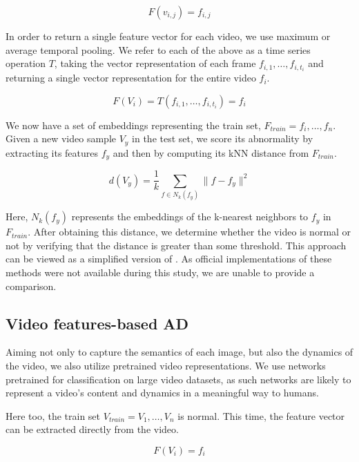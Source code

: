 \documentclass{article}
\begin{document}
\begin{equation}
    F(v_{i,j})=f_{i,j}
\end{equation}

In order to return a single feature vector for each video, we use maximum or average temporal pooling. We refer to each of the above as a time series operation $T$, taking the vector representation of each frame $f_{i,1}, \ldots, f_{i,t_i}$ and returning a single vector representation for the entire video $f_i$.

\begin{equation}
    F(V_i)=T(f_{i,1},\ldots,f_{i,t_i}) = f_i
\end{equation}

We now have a set of embeddings representing the train set, $F_{train}=f_i,\ldots,f_n$. Given a new video sample $V_y$ in the test set, we score its abnormality by extracting its features $f_y$ and then by computing its kNN distance from $F_{train}$.

\begin{equation}
    \label{eq:knn}
    d(V_y) = \frac{1}{k} \sum_{f \in N_k(f_y)}{\|f - f_y\|^2}
\end{equation}

Here, $N_k(f_y)$ represents the embeddings of the k-nearest neighbors to $f_y$ in $F_{train}$. After obtaining this distance, we determine whether the video is normal or not by verifying that the distance is greater than some threshold. 
This approach can be viewed as a simplified version of \cite{doshi2020continual,pourreza2021ano}. As official implementations of these methods were not available during this study, we are unable to provide a comparison.

\subsection{Video features-based AD}

Aiming not only to capture the semantics of each image, but also the dynamics of the video, we also utilize pretrained video representations. We use networks pretrained for classification on large video datasets, as such networks are likely to represent a video's content and dynamics in a meaningful way to humans.

Here too, the train set $V_{train}=V_1,\ldots,V_n$ is normal. This time, the feature vector can be extracted directly from the video. 

\begin{equation}
    F(V_i)=f_i
\end{equation}
\end{document}
